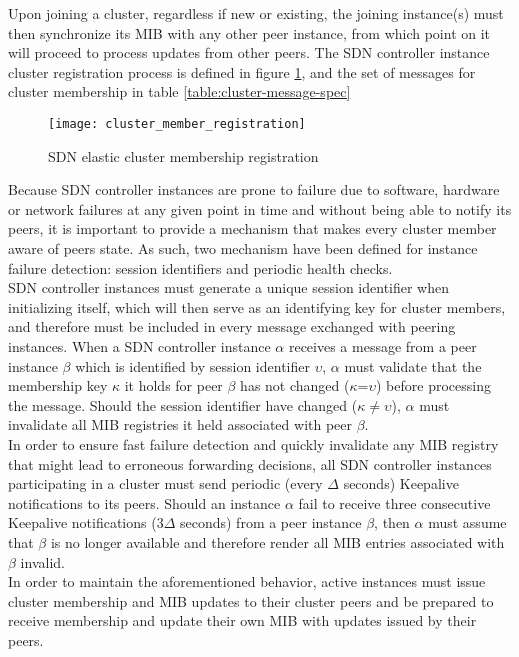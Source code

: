 Upon joining a cluster, regardless if new or existing, the joining instance(s) must then synchronize its \gls{MIB} with any other peer instance, from which point on it will proceed to process updates from other peers.
The \gls{SDN} controller instance cluster registration process is defined in figure \ref{fig:cluster_registration_process}, and the set of messages for cluster membership in table \ref{table:cluster-message-spec}\\
%
\begin{figure}
	\centering
	\texttt{[image: cluster\_member\_registration]}
	\caption{SDN elastic cluster membership registration}
	\label{fig:cluster_registration_process}
\end{figure}
%
Because \gls{SDN} controller instances are prone to failure due to software, hardware or network failures at any given point in time and without being able to notify its peers, it is important to provide a mechanism that makes every cluster member aware of peers state.
As such, two mechanism have been defined for instance failure detection: session identifiers and periodic health checks.\\
\gls{SDN} controller instances must generate a unique session identifier when initializing itself, which will then serve as an identifying key for cluster members, and therefore must be included in every message exchanged with peering instances.
When a \gls{SDN} controller instance $\alpha$ receives a message from a peer instance $\beta$ which is identified by session identifier $\upsilon$, $\alpha$ must validate that the membership key $\kappa$ it holds for peer $\beta$ has not changed ($\kappa$=$\upsilon$) before processing the message.
Should the session identifier have changed ($\kappa$$\neq$$\upsilon$), $\alpha$ must invalidate all \gls{MIB} registries it held associated with peer $\beta$.\\
In order to ensure fast failure detection and quickly invalidate any \gls{MIB} registry that might lead to erroneous forwarding decisions, all \gls{SDN} controller instances participating in a cluster must send periodic (every $\Delta$ seconds) \gls{Keepalive} notifications to its peers.
Should an instance $\alpha$ fail to receive three consecutive \gls{Keepalive} notifications (3$\Delta$ seconds) from a peer instance $\beta$, then $\alpha$ must assume that $\beta$ is no longer available and therefore render all \gls{MIB} entries associated with $\beta$ invalid.\\
%
In order to maintain the aforementioned behavior, active instances must issue cluster membership and \gls{MIB} updates to their cluster peers and be prepared to receive membership and update their own \gls{MIB} with updates issued by their peers.
